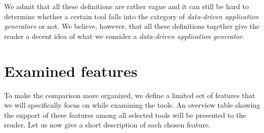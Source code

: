 We admit that all these definitions are rather vague and it can still be hard to determine whether a certain tool falls into the category of \emph{data-driven application generators} or not. We believe, however, that all these definitions together give the reader a decent idea of what we consider a \emph{data-driven application generator}.

\section{Examined features}
\label{sec:rw:features}

To make the comparison more organized, we define a limited set of features that we will specifically focus on while examining the tools. An overview table showing the support of these features among all selected tools will be presented to the reader. Let us now give a short description of each chosen feature.

